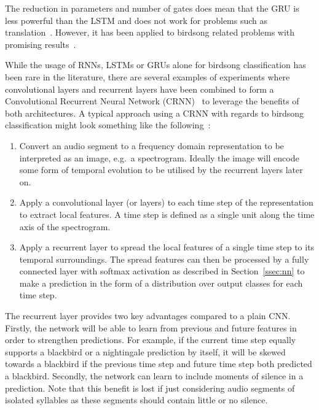 The reduction in parameters and number of gates does mean that the GRU is less
powerful than the LSTM and does not work for problems such as
translation~\cite{britz2017massive}. However, it has been applied to birdsong
related problems with promising
results~\cite{parrilla2022polyphonic,adavanne2017stacked}.

While the usage of RNNs, LSTMs or GRUs alone for birdsong classification has
been rare in the literature, there are several examples of experiments where
convolutional layers and recurrent layers have been combined to form a
Convolutional Recurrent Neural Network
(CRNN)~\cite{yan2021birdsong,mukherjee2018convolutional} to leverage
the benefits of both architectures. A typical approach using a CRNN with regards
to birdsong classification might look something like the
following~\cite{crous2019polyphonic}:

\begin{enumerate}

  \item Convert an audio segment to a frequency domain representation to be
    interpreted as an image, e.g.\ a spectrogram. Ideally the image will encode
    some form of temporal evolution to be utilised by the recurrent layers later
    on.

  \item Apply a convolutional layer (or layers) to each time step of the
    representation to extract local features. A time step is defined as
    a single unit along the time axis of the spectrogram.

  \item Apply a recurrent layer to spread the local features of a single time
    step to its temporal surroundings. The spread features can then be processed
    by a fully connected layer with softmax activation as described in
    Section~\ref{ssec:nn} to make a prediction in the form of a distribution
    over output classes for each time step.

\end{enumerate}

The recurrent layer provides two key advantages compared to a plain CNN\@.
Firstly, the network will be able to learn from previous and future features in
order to strengthen predictions. For example, if the current time step equally
supports a blackbird or a nightingale prediction by itself, it will be skewed
towards a blackbird if the previous time step and future time step both
predicted a blackbird. Secondly, the network can learn to include moments of
silence in a prediction. Note that this benefit is lost if just considering
audio segments of isolated syllables as these segments should contain little or
no silence.

